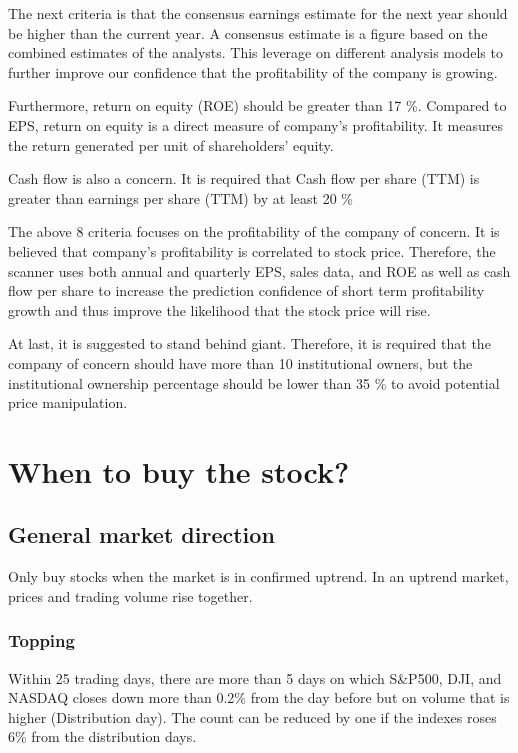 \documentclass{article}
\begin{document}
The next criteria is that the consensus earnings estimate for the next year should be higher than the current year. A consensus estimate is a figure based on the combined estimates of the analysts. This leverage on different analysis models to further improve our confidence that the profitability of the company is growing.

Furthermore, return on equity (ROE) should be greater than 17 \%. Compared to EPS, return on equity is a direct measure of company's profitability. It measures the return generated per unit of shareholders' equity.

Cash flow is also a concern. It is required that Cash flow per share (TTM) is greater than earnings per share (TTM) by at least 20 \%

The above 8 criteria focuses on the profitability of the company of concern. It is believed that company's profitability is correlated to stock price. Therefore, the scanner uses both annual and quarterly EPS, sales data, and ROE as well as cash flow per share to increase the prediction confidence of short term profitability growth and thus improve the likelihood that the stock price will rise.

At last, it is suggested to stand behind giant. Therefore, it is required that the company of concern should have more than 10 institutional owners, but the institutional ownership percentage should be lower than 35 \% to avoid potential price manipulation.

\section{When to buy the stock?}
\label{Whentobuythestock}
\subsection{General market direction}
Only buy stocks when the market is in confirmed uptrend. In an uptrend market, prices and trading volume rise together.

\subsubsection{Topping}
Within 25 trading days, there are more than 5 days on which S\&P500, DJI, and NASDAQ closes down more than 0.2\% from the day before but on volume that is higher (Distribution day). The count can be reduced by one if the indexes roses 6\% from the distribution days.
\end{document}
